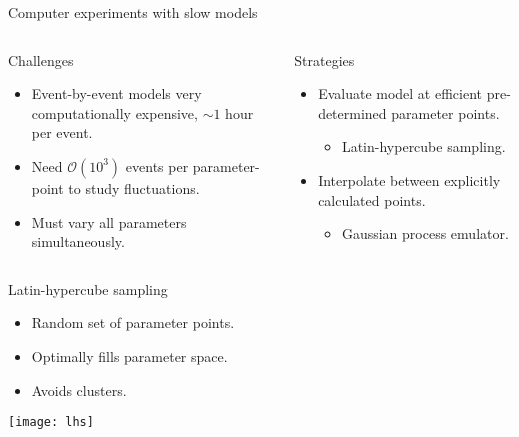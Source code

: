 \documentclass{beamer}
\begin{document}
\begin{frame}{Computer experiments with slow models}
  \begin{columns}[t]
    \begin{block}{\strut Challenges\vspace{-1pt}}
      \begin{itemize}
        \item Event-by-event models very computationally expensive, ${\sim}1$ hour per event.
        \item Need $\mathcal O(10^3)$ events per parameter-point to study fluctuations.
        \item Must vary all parameters simultaneously.
      \end{itemize}
    \end{block}

    \begin{block}{\strut Strategies\vspace{-1pt}}
      \begin{itemize}
        \item Evaluate model at efficient pre-determined parameter points.
          \begin{itemize}
            \item Latin-hypercube sampling.
          \end{itemize}
        \item Interpolate between explicitly calculated points.
          \begin{itemize}
            \item Gaussian process emulator.
          \end{itemize}
      \end{itemize}
    \end{block}
  \end{columns}
\end{frame}


\begin{frame}{Latin-hypercube sampling}
  \begin{itemize}
    \item Random set of parameter points.
    \item Optimally fills parameter space.
    \item Avoids clusters.
  \end{itemize}

  \bgs 

  \centering
  \texttt{[image: lhs]}
\end{frame}
\end{document}
